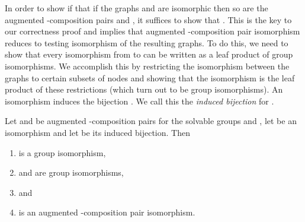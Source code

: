 In order to show if that if the graphs  and  are isomorphic then so are the augmented -composition pairs  and , it suffices to show that .  This is the key to our correctness proof and implies that augmented -composition pair isomorphism reduces to testing isomorphism of the resulting graphs. To do this, we need to show that every isomorphism from  to  can be written as a leaf product of group isomorphisms.  We accomplish this by restricting the isomorphism between the graphs to certain subsets of nodes and showing that the isomorphism is the leaf product of these restrictions (which turn out to be group isomorphisms).  An isomorphism  induces the bijection .  We call this  the \emph{induced bijection} for .

\begin{lemma}
  \label{lem:iso-decomp}
  Let  and  be augmented -composition pairs for the solvable groups  and , let  be an isomorphism and let  be its induced bijection.  Then



  \begin{enumerate}
  \item  is a group isomorphism,
  \item  and  are group isomorphisms,
  \item  and
  \item  is an augmented -composition pair isomorphism.
  \end{enumerate}
\end{lemma}

